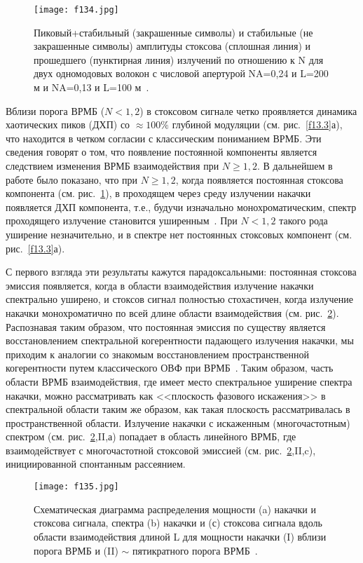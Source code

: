 \begin{figure}
\centering
\texttt{[image: f134.jpg]}\\
\caption{Пиковый+стабильный (закрашенные символы) и стабильные (не
закрашенные символы) амплитуды стоксова (сплошная линия) и
прошедшего (пунктирная линия) излучений по отношению к N для двух
одномодовых волокон с числовой апертурой NA=0,24 и L=200 м и NA=0,13
и L=100 м~\cite{1300}.} \label{f13.4}
\end{figure}
Вблизи порога ВРМБ ($N<1,2$) в стоксовом сигнале четко проявляется
динамика хаотических пиков (ДХП) со $\approx 100 \%$ глубиной
модуляции (см. рис.~\ref{f13.3}а), что находится в четком согласии с
классическим пониманием ВРМБ. Эти сведения говорят о том, что
появление постоянной компоненты является следствием изменения ВРМБ
взаимодействия при $N\geq1,2$. В дальнейшем в работе \cite{1300}
было показано, что при $N\geq1,2$, когда появляется постоянная
стоксова компонента (см. рис.~\ref{f13.4}), в проходящем через среду
излучении накачки появляется ДХП компонента, т.е., будучи изначально
монохроматическим, спектр проходящего излучение становится уширенным~\cite{1336}.
При $N<1,2$ такого рода уширение незначительно, и в
спектре нет постоянных стоксовых компонент (см. рис.~\ref{f13.3}а).

С первого взгляда эти результаты кажутся парадоксальными: постоянная
стоксова эмиссия появляется, когда в области взаимодействия
излучение накачки спектрально уширено, и стоксов сигнал полностью
стохастичен, когда излучение накачки монохроматично по всей длине
области взаимодействия (см. рис.~\ref{f13.5}). Распознавая таким
образом, что постоянная эмиссия по существу является восстановлением
спектральной когерентности падающего излучения накачки, мы приходим
к аналогии со знакомым восстановлением пространственной
когерентности путем классического ОВФ при ВРМБ~\cite{1337}. Таким
образом, часть области ВРМБ взаимодействия, где имеет место
спектральное уширение спектра накачки, можно рассматривать как
<<плоскость фазового искажения>> в спектральной области таким же
образом, как такая плоскость рассматривалась в пространственной
области. Излучение накачки с искаженным (многочастотным) спектром
(см. рис.~\ref{f13.5},II,а) попадает в область линейного ВРМБ, где
взаимодействует с многочастотной стоксовой эмиссией (см. рис.~\ref{f13.5},II,c),
 инициированной спонтанным рассеянием.


\begin{figure}
\centering
\texttt{[image: f135.jpg]}\\
\caption{Схематическая диаграмма распределения мощности (a) накачки
и стоксова сигнала, спектра (b) накачки и (с) стоксова сигнала вдоль
области взаимодействия длиной L для мощности накачки (I) вблизи
порога ВРМБ и (II) $\sim$ пятикратного порога ВРМБ~\cite{1300}.}
\label{f13.5}
\end{figure}


